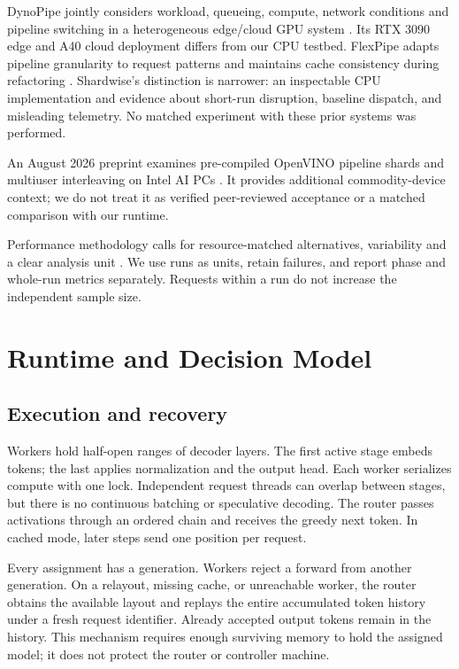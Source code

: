\documentclass[conference]{IEEEtran}
\begin{document}
DynoPipe jointly considers workload, queueing, compute, network
conditions and pipeline switching in a heterogeneous edge/cloud GPU
system \citep{lin2026dynopipe}. Its RTX 3090 edge and A40 cloud
deployment differs from our CPU testbed. FlexPipe adapts pipeline
granularity to request patterns and maintains cache consistency during
refactoring \citep{lin2026flexpipe}. Shardwise's distinction is
narrower: an inspectable CPU implementation and evidence about short-run
disruption, baseline dispatch, and misleading telemetry. No matched
experiment with these prior systems was performed.

An August 2026 preprint examines pre-compiled OpenVINO pipeline shards
and multiuser interleaving on Intel AI PCs
\citep{berenbaum2026precompiled}. It provides additional
commodity-device context; we do not treat it as verified peer-reviewed
acceptance or a matched comparison with our runtime.

Performance methodology calls for resource-matched alternatives,
variability and a clear analysis unit
\citep{jain1991art, hoefler2015benchmarking}. We use runs as units,
retain failures, and report phase and whole-run metrics separately.
Requests within a run do not increase the independent sample size.

\hypertarget{runtime-and-decision-model}{%
\section{Runtime and Decision Model}\label{runtime-and-decision-model}}

\hypertarget{execution-and-recovery}{%
\subsection{Execution and recovery}\label{execution-and-recovery}}

Workers hold half-open ranges of decoder layers. The first active stage
embeds tokens; the last applies normalization and the output head. Each
worker serializes compute with one lock. Independent request threads can
overlap between stages, but there is no continuous batching or
speculative decoding. The router passes activations through an ordered
chain and receives the greedy next token. In cached mode, later steps
send one position per request.

Every assignment has a generation. Workers reject a forward from another
generation. On a relayout, missing cache, or unreachable worker, the
router obtains the available layout and replays the entire accumulated
token history under a fresh request identifier. Already accepted output
tokens remain in the history. This mechanism requires enough surviving
memory to hold the assigned model; it does not protect the router or
controller machine.
\end{document}
